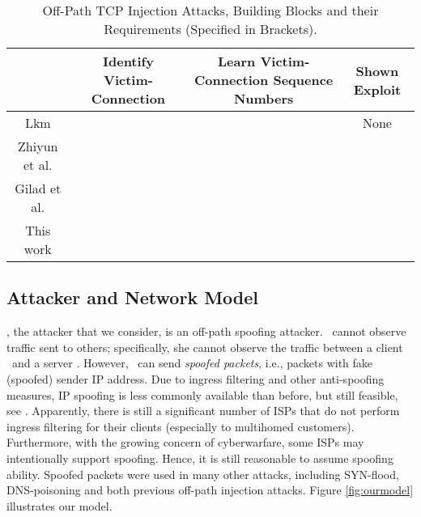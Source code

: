 \documentclass[conference]{IEEEtran}
\begin{document}
\begin{table*}
\centering
\begin{tabular}{ c || c | c | c |}
    \cline{2-4}
                                 & Identify Victim-Connection         & Learn Victim-Connection Sequence Numbers           & Shown Exploit\\ \hline \hline
                                     
        Lkm \cite{lkm:phrack:07} &  & & None\\ \hline

    Zhiyun et al. \cite{snptcp,CCS12:tcp}  & & &  \\ \hline
    	
    Gilad et al. \cite{woottcp}  &  & & \\ \hline
        
    This work                    & 
    &                         &  \\
    \hline
    
\end{tabular}
\caption{Off-Path TCP Injection Attacks, Building Blocks and their Requirements (Specified in Brackets).}
\label{Tbl:blocks}
\end{table*}




\subsection{Attacker and Network Model} \label{intro:model}

\mal, the attacker that we consider, is an off-path spoofing attacker. \mal\ cannot observe traffic sent to others; specifically, she cannot observe the traffic between a client \wini\ and a server \lin. However, \mal\ can send {\em spoofed packets}, i.e., packets with fake (spoofed) sender IP address. Due to ingress filtering \cite{rfc3013} and other anti-spoofing measures, IP spoofing is less commonly available than before, but still feasible, see \cite{SpooferProject, journals/toit/EhrenkranzL09}. Apparently, there is still a significant number of ISPs that do not perform ingress filtering for their clients (especially to multihomed customers). Furthermore, with the growing concern of cyberwarfare, some ISPs may intentionally support spoofing. Hence, it is still reasonable to assume spoofing ability. Spoofed packets were used in many other attacks, including SYN-flood, DNS-poisoning and both previous off-path injection attacks. Figure \ref{fig:ourmodel} illustrates our model.
\end{document}
